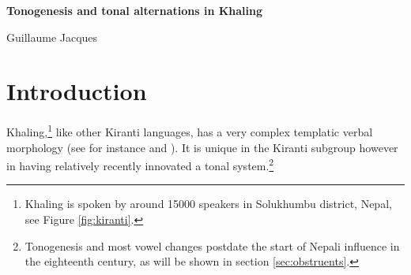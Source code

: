 \documentclass[oldfontcommands,oneside,a4paper,11pt]{article}
\begin{document}
 
 

\begin{flushleft}
{\LARGE \textbf{Tonogenesis and tonal alternations in Khaling}}
\newline

{\Large Guillaume Jacques}
\newline

\end{flushleft}
\newline


\sloppy


%
 
 \section{Introduction}
Khaling,\footnote{Khaling is spoken by around 15000 speakers in Solukhumbu district, Nepal, see Figure \ref{fig:kiranti}.} like other Kiranti languages, has a very complex templatic verbal morphology (see for instance \citealt{bickel07chintang} and \citealt{jacques12agreement}). It is unique in the Kiranti subgroup however in having relatively recently innovated a tonal system.\footnote{Tonogenesis and most vowel changes postdate the start of Nepali influence in the eighteenth century, as will be shown in section \ref{sec:obstruents}.} 
\end{document}
